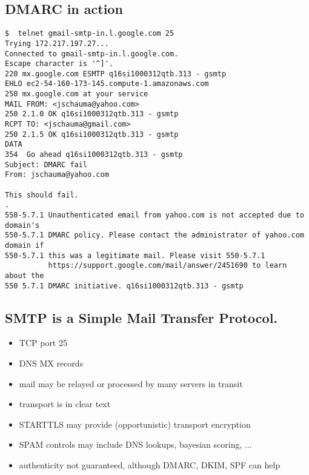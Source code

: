 \documentclass[xga]{xdvislides}
\begin{document}
\subsection{DMARC in action}
\smallish
\begin{verbatim}
$  telnet gmail-smtp-in.l.google.com 25
Trying 172.217.197.27...
Connected to gmail-smtp-in.l.google.com.
Escape character is '^]'.
220 mx.google.com ESMTP q16si1000312qtb.313 - gsmtp
EHLO ec2-54-160-173-145.compute-1.amazonaws.com
250 mx.google.com at your service
MAIL FROM: <jschauma@yahoo.com>
250 2.1.0 OK q16si1000312qtb.313 - gsmtp
RCPT TO: <jschauma@gmail.com>
250 2.1.5 OK q16si1000312qtb.313 - gsmtp
DATA
354  Go ahead q16si1000312qtb.313 - gsmtp
Subject: DMARC fail
From: jschauma@yahoo.com

This should fail.
.
550-5.7.1 Unauthenticated email from yahoo.com is not accepted due to domain's
550-5.7.1 DMARC policy. Please contact the administrator of yahoo.com domain if
550-5.7.1 this was a legitimate mail. Please visit 550-5.7.1
          https://support.google.com/mail/answer/2451690 to learn about the
550 5.7.1 DMARC initiative. q16si1000312qtb.313 - gsmtp
\end{verbatim}
\Normalsize

\subsection{SMTP is a Simple Mail Transfer Protocol.}
\begin{itemize}
	\item TCP port 25
	\item DNS MX records
	\item mail may be relayed or processed by many servers in transit
	\item transport is in clear text
	\item STARTTLS may provide (opportunistic) transport encryption
	\item SPAM controls may include DNS lookups, bayesian scoring, ...
	\item authenticity not guaranteed, although DMARC, DKIM, SPF can help
\end{itemize}
\end{document}

